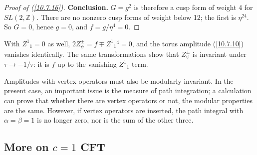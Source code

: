 \begin{tcolorbox}[breakable]
\begin{proof}[Proof of (\ref{10.7.16})]
			\textbf{Conclusion.} $G=g^{2}$ is therefore a cusp form of weight 4 for $SL(2,\mathds Z)$. There are no nonzero cusp forms of weight below 12; the first is $\eta^{24}$. So $G=0$, hence $g=0$, and $f=g/\eta^{4}=0$.
		\end{proof}
		With $Z^1{}_1=0$ as well, $2Z_\psi^{\pm}=f\mp Z^1{}_1{}^4=0$, and the torus amplitude (\ref{10.7.10}) vanishes identically. The same transformations show that $Z_\psi^\pm$ is invariant under $\tau\to-1/\tau$: it is $f$ up to the vanishing $Z^1{}_1$ term.
	\end{tcolorbox}
	
	
	Amplitudes with vertex operators must also be modularly invariant. In the present case, an important issue is the measure of path integration; a calculation can prove that whether there are vertex operators or not, the modular properties are the same. However, if vertex operators are inserted, the path integral with $\alpha=\beta=1$ is no longer zero, nor is the sum of the other three.
	
	
	
	\subsection*{More on $c=1$ CFT}
	
